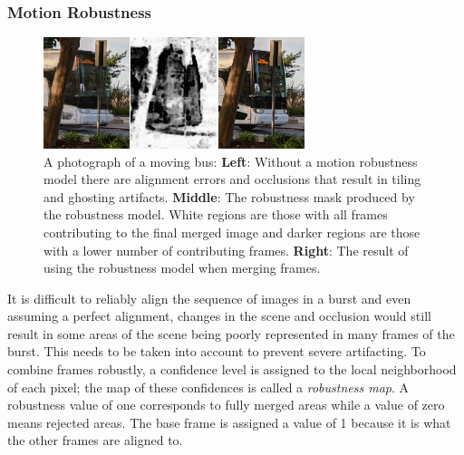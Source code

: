 \documentclass{sig-alternate}
\begin{document}


\subsubsection{Motion Robustness}
\label{sec:robustnessModel}

\begin{figure}
\centering
\includegraphics[width=3in]{figures/wronski2019-figure-9-95quality.jpg}
\caption{A photograph of a moving bus: \textbf{Left}: Without a motion robustness model there are alignment errors and occlusions that result in tiling and ghosting artifacts. \textbf{Middle}: The robustness mask produced by the robustness model. White regions are those with all frames contributing to the final merged image and darker regions are those with a lower number of contributing frames. \textbf{Right}: The result of using the robustness model when merging frames. \cite{Wronski2019}}
\label{fig:Wronski2019Fig9}
\end{figure}

 
It is difficult to reliably align the sequence of images in a burst and even assuming a perfect alignment, changes in the scene and occlusion would still result in some areas of the scene being poorly represented in many frames of the burst. This needs to be taken into account to prevent severe artifacting. To combine frames robustly, a confidence level is assigned to the local neighborhood of each pixel; the map of these confidences is called a \emph{robustness map}.
A robustness value of one corresponds to fully merged areas while a value of zero means rejected areas. The base frame is assigned a value of 1 because it is what the other frames are aligned to.
\end{document}
